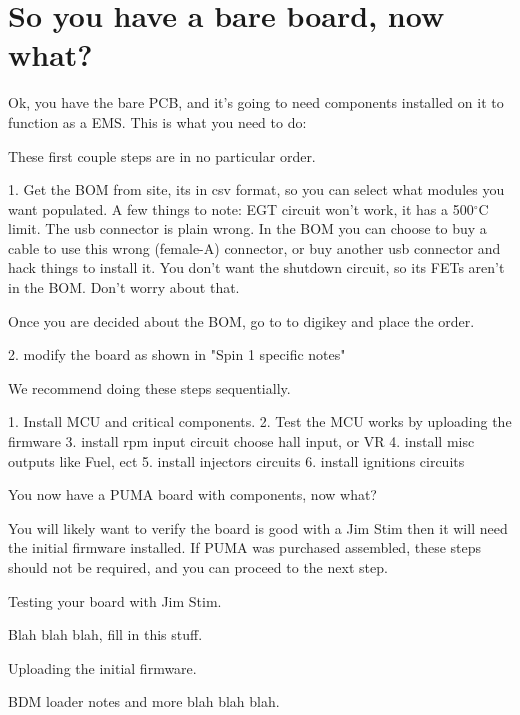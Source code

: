 \section{So you have a bare board, now what?}

Ok, you have the bare PCB, and it's going to need components installed on it to function as a EMS. This is what you need to do:

These first couple steps are in no particular order.

1. Get the BOM from site, its in csv format, so you can select what modules you want populated.
A few things to note:
EGT circuit won't work, it has a 500$^{\circ}$C limit.
The usb connector is plain wrong. In the BOM you can choose to buy a cable to use this wrong (female-A) connector, or buy another usb connector and hack things to install it.
You don't want the shutdown circuit, so its FETs aren't in the BOM. Don't worry about that.

Once you are decided about the BOM, go to to digikey and place the order.

2. modify the board as shown in "Spin 1 specific notes"

We recommend doing these steps sequentially.

1. Install MCU and critical components.
2. Test the MCU works by uploading the firmware
3. install rpm input circuit choose hall input, or VR
4. install misc outputs like Fuel, ect
5. install injectors circuits
6. install ignitions circuits

You now have a PUMA board with components, now what?

You will likely want to verify the board is good with a Jim Stim  then it will need the initial firmware installed. If PUMA was purchased assembled, these steps should not be required, and you can proceed to the next step.

	Testing your board with Jim Stim.

Blah blah blah, fill in this stuff.

	Uploading the initial firmware.

BDM loader notes and more blah blah blah. 
 
